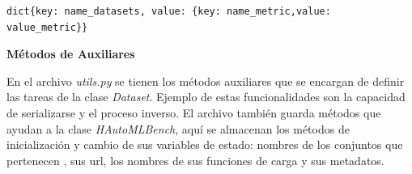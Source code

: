 \begin{lstlisting}[caption= Estructura del archivo que almacena los resultados experimentales, label= code:archive-result]
dict{key: name_datasets, value: {key: name_metric,value: value_metric}}
\end{lstlisting}
\begin{flushleft} 
    {\large {\textbf{Métodos de Auxiliares}}}\label{method:methods}
\end{flushleft}
En el archivo \textit{utils.py} se tienen los métodos auxiliares que se encargan de definir las tareas de la clase \textit{Dataset}. Ejemplo de estas funcionalidades 
son la capacidad de serializarse y el proceso inverso. El archivo también guarda métodos que ayudan a la clase \textit{HAutoMLBench}, aquí se almacenan los métodos de 
inicialización y cambio de sus variables de estado: nombres de los conjuntos que pertenecen , sus url, los nombres de sus funciones de carga y sus metadatos.   





